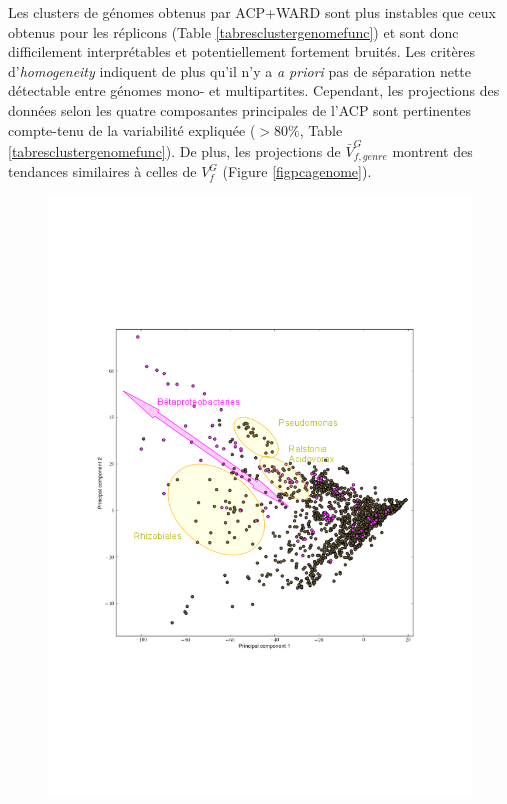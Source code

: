 	 Les clusters de génomes obtenus par ACP+WARD sont plus instables que ceux obtenus pour les réplicons (Table \ref{tabresclustergenomefunc}) et sont donc difficilement interprétables et potentiellement fortement bruités. Les critères d'\textit{homogeneity} indiquent de plus qu'il n'y a \textit{a priori} pas de séparation nette détectable entre génomes mono- et multipartites. Cependant, les projections des données selon les quatre composantes principales de l'ACP sont pertinentes compte-tenu de la variabilité expliquée ($>80\%$, Table \ref{tabresclustergenomefunc}). De plus, les projections de $\bar{V}_{f,genre}^{G}$ montrent des tendances similaires à celles de $V_{f}^{G}$ (Figure \ref{figpcagenome}). \\
 		

\begin{figure}
	\begin{minipage}{0.55\textwidth}
		\includegraphics[trim=2cm 7cm 2cm 6cm,clip, width=\textwidth]{./img/pca_genome.png}

\end{minipage}
\end{figure}
